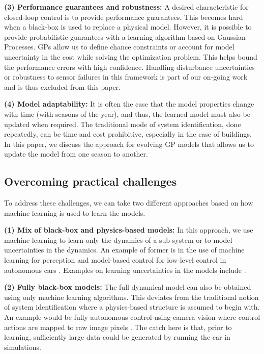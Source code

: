 \noindent \textbf{(3) Performance guarantees and robustness:} A desired characteristic for closed-loop control is to provide performance guarantees. This becomes hard when a black-box is used to replace a physical model. However, it is possible to provide probabilistic guarantees with a learning algorithm based on Gaussian Processes. GPs allow us to define chance constraints or account for model uncertainty in the cost while solving the optimization problem. This helps bound the performance errors with high confidence. Handling disturbance uncertainties or robustness to sensor failures in this framework is part of our on-going work and is thus excluded from this paper.

\noindent \textbf{(4) Model adaptability:} It is often the case that the model properties change with time (with seasons of the year), and thus, the learned model must also be updated when required. The traditional mode of system identification, done repeatedly, can be time and cost prohibitive, especially in the case of buildings. In this paper, we discuss the approach for evolving GP models that allows us to update the model from one season to another.


\subsection{Overcoming practical challenges}
To address these challenges, we can take two different approaches based on how machine learning is used to learn the models.

\noindent \textbf{(1) Mix of black-box and physics-based models:} In this approach, we use machine learning to learn only the dynamics of a sub-system or to model uncertainties in the dynamics. An example of former is in the use of machine learning for perception and model-based control for low-level control in autonomous cars \cite{Urmson2008}. Examples on learning uncertainties in the models include \cite{Berkenkamp2015,Desaraju2016}.

\noindent \textbf{(2) Fully black-box models:} The full dynamical model can also be obtained using only machine learning algorithms. This deviates from the traditional notion of system identification where a physics-based structure is assumed to begin with. An example would be fully autonomous control using camera vision where control actions are mapped to raw image pixels \cite{Bojarski2016}. The catch here is that, prior to learning, sufficiently large data could be generated by running the car in simulations.

